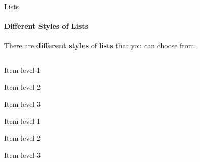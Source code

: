 \documentclass[aspectratio=169]{beamer}
\begin{document}
\begin{frame}{Lists}
    \framesubtitle{Different Styles of Lists}

    \vspace{-.8cm}
    \begin{coloredblock}[yellow]
        \centering
        There are \textbf{different styles} of \textbf{lists} that you can choose from.
    \end{coloredblock}

    \vspace{-0.5cm}

    \begin{columns}
        \begin{column}{0.49\textwidth}
            \begin{coloredblock}
                \begin{romanenumerate}
                    \item Item level 1
                    \begin{romanenumerate}
                        \item Item level 2
                        \begin{romanenumerate}
                            \item Item level 3
                        \end{romanenumerate}
                    \end{romanenumerate}
                \end{romanenumerate}
            \end{coloredblock}
    
            \begin{coloredblock}
                \begin{boxenumerate}
                \item Item level 1
                    \begin{boxenumerate}
                        \item Item level 2
                        \begin{boxenumerate}
                            \item Item level 3
                        \end{boxenumerate}
                    \end{boxenumerate}
                \end{boxenumerate}
            \end{coloredblock}
        

\end{column}
\end{columns}
\end{frame}
\end{document}
